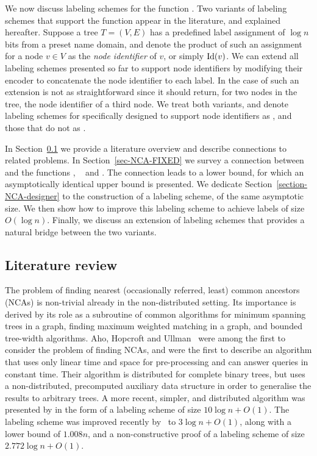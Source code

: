 	We now discuss  labeling schemes for the function \NCA. 
	Two variants of labeling schemes that support  the  function appear in the literature, \NCAl and \NCAf explained hereafter.
Suppose a tree $T=(V,E)$ has a predefined label assignment of $\log n$ bits  from a preset name domain, and denote  the product of such an  assignment for a  node $v \in V$  as the \emph{node identifier} of  $v$, or simply $\operatorname{Id}(v)$.  We can extend all labeling schemes presented so far to support node identifiers  by modifying their encoder to concatenate the node identifier to each label. In the case of \NCA such an extension is not as straightforward since it should return, for two nodes in the tree, the node identifier of  a third node.  We treat both variants, and denote labeling schemes for \NCA specifically designed to support node identifiers as \NCAf, and those that do not as  \NCAl.

In Section~\ref{sec:Lit-NCA} we provide  a literature overview and describe connections to related problems. In Section~\ref{sec-NCA-FIXED} we survey a  connection between \NCAf and the functions \distance,  \seplevel~ and \centerf. The connection leads to a lower bound, for which an asymptotically identical upper bound is presented. We  dedicate  Section~\ref{section-NCA-designer}  to the  construction of a \NCAl labeling scheme, of the same asymptotic size.
We then show how to improve  this labeling scheme to achieve labels of size $O(\log n)$. Finally, we  discuss  an  extension  of labeling schemes that  provides  a natural bridge between the two variants.

\subsection{Literature review}\label{sec:Lit-NCA}
The problem of finding nearest (occasionally referred, least) common ancestors (NCAs) is non-trivial already in the non-distributed setting. 
Its importance is derived by its role as a subroutine of common algorithms for minimum spanning trees in a graph, finding maximum weighted matching in a graph, and bounded tree-width algorithms.
Aho, Hopcroft and Ullman~ were among the first to consider the problem of finding NCAs, and  were the first to describe an algorithm that uses only linear time and space for pre-processing and can answer \NCA queries in constant time.
Their algorithm is distributed for complete binary trees, but uses a non-distributed, precomputed auxiliary data structure in order to generalise the results to arbitrary trees.
A more recent,  simpler, and  distributed algorithm was presented by  in the form of a \NCAl labeling scheme of size $10 \log n+O(1)$.  The labeling scheme was improved recently by~ to $3 \log n+O(1)$, along with a lower bound of $1.008n$, and a  non-constructive proof of a labeling scheme of size $2.772 \log n +O(1)$.
 

